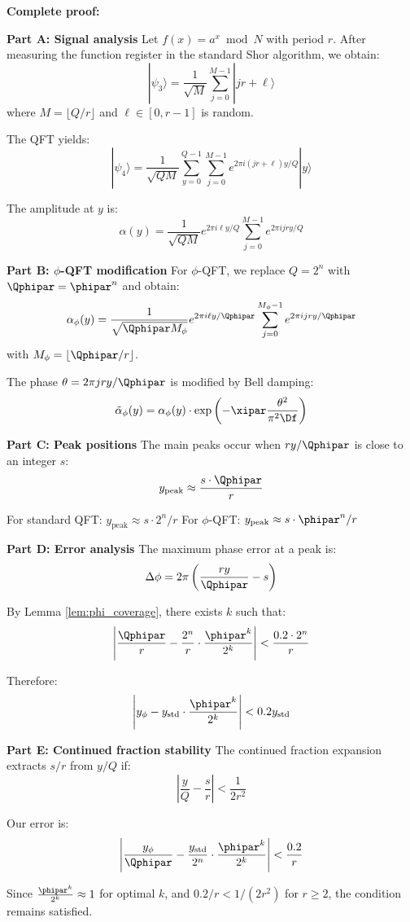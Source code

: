 \textbf{Complete proof:}

\textbf{Part A: Signal analysis}
Let $f(x) = a^x \bmod N$ with period $r$. After measuring the function register in the standard Shor algorithm, we obtain:
\[
|\psi_3\rangle = \frac{1}{\sqrt{M}} \sum_{j=0}^{M-1} |jr + \ell\rangle
\]
where $M = \lfloor Q/r \rfloor$ and $\ell \in [0, r-1]$ is random.

The QFT yields:
\[
|\psi_4\rangle = \frac{1}{\sqrt{QM}} \sum_{y=0}^{Q-1} \sum_{j=0}^{M-1} e^{2\pi i (jr + \ell)y/Q} |y\rangle
\]

The amplitude at $y$ is:
\[
\alpha(y) = \frac{1}{\sqrt{QM}} e^{2\pi i \ell y/Q} \sum_{j=0}^{M-1} e^{2\pi i j r y/Q}
\]

\textbf{Part B: $\phi$-QFT modification}
For $\phi$-QFT, we replace $Q = 2^n$ with $\Qphipar = \phipar^n$ and obtain:
\[
\alpha_{\phi}(y) = \frac{1}{\sqrt{\Qphipar M_{\phi}}} e^{2\pi i \ell y/\Qphipar} \sum_{j=0}^{M_{\phi}-1} e^{2\pi i j r y/\Qphipar}
\]
with $M_{\phi} = \lfloor \Qphipar/r \rfloor$.

The phase $\theta = 2\pi j r y/\Qphipar$ is modified by Bell damping:
\[
\tilde{\alpha}_{\phi}(y) = \alpha_{\phi}(y) \cdot \exp\left(-\xipar \frac{\theta^2}{\pi^2 \Df}\right)
\]

\textbf{Part C: Peak positions}
The main peaks occur when $ry/\Qphipar$ is close to an integer $s$:
\[
y_{\text{peak}} \approx \frac{s \cdot \Qphipar}{r}
\]

For standard QFT: $y_{\text{peak}} \approx s \cdot 2^n / r$
For $\phi$-QFT: $y_{\text{peak}} \approx s \cdot \phipar^n / r$

\textbf{Part D: Error analysis}
The maximum phase error at a peak is:
\[
\Delta\phi = 2\pi \left( \frac{ry}{\Qphipar} - s \right)
\]

By Lemma \ref{lem:phi_coverage}, there exists $k$ such that:
\[
\left| \frac{\Qphipar}{r} - \frac{2^n}{r} \cdot \frac{\phipar^k}{2^k} \right| < \frac{0.2 \cdot 2^n}{r}
\]

Therefore:
\[
\left| y_{\phi} - y_{\text{std}} \cdot \frac{\phipar^k}{2^k} \right| < 0.2 y_{\text{std}}
\]

\textbf{Part E: Continued fraction stability}
The continued fraction expansion extracts $s/r$ from $y/Q$ if:
\[
\left| \frac{y}{Q} - \frac{s}{r} \right| < \frac{1}{2r^2}
\]

Our error is:
\[
\left| \frac{y_{\phi}}{\Qphipar} - \frac{y_{\text{std}}}{2^n} \cdot \frac{\phipar^k}{2^k} \right| < \frac{0.2}{r}
\]

Since $\frac{\phipar^k}{2^k} \approx 1$ for optimal $k$, and $0.2/r < 1/(2r^2)$ for $r \geq 2$, the condition remains satisfied.

